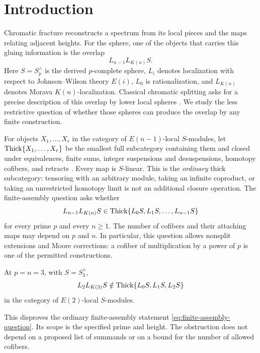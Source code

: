 \section{Introduction}\label{sec:introduction}

Chromatic fracture reconstructs a spectrum from its local pieces and the
maps relating adjacent heights. For the sphere, one of the objects that
carries this gluing information is the overlap
\[
                         L_{n-1}L_{K(n)}S.
\]
Here \(S=S_p^\wedge\) is the derived \(p\)-complete sphere,
\(L_i\) denotes localization with respect to Johnson--Wilson theory
\(E(i)\), \(L_0\) is rationalization, and \(L_{K(n)}\) denotes Morava
\(K(n)\)-localization. Classical chromatic splitting asks for a precise
description of this overlap by lower local spheres
\citep{Hovey93,BB19}. We study the less restrictive question of whether
those spheres can produce the overlap by any finite construction.

For objects \(X_1,\ldots,X_r\) in the category of \(E(n-1)\)-local
\(S\)-modules, let
\(\operatorname{Thick}\{X_1,\ldots,X_r\}\) be the smallest full subcategory containing
them and closed under equivalences, finite sums, integer suspensions and
desuspensions, homotopy cofibers, and retracts
\citep[Definitions~1.2, 1.3(c), and 1.5(c)]{HS99}. Every map is \(S\)-linear.
This is the \emph{ordinary} thick subcategory: tensoring with an arbitrary
module, taking an infinite coproduct, or taking an unrestricted homotopy
limit is not an additional closure operation. The finite-assembly question
asks whether
\begin{equation}\label{eq:finite-assembly-question}
 L_{n-1}L_{K(n)}S\in
       \operatorname{Thick}\{L_0S,L_1S,\ldots,L_{n-1}S\}
\end{equation}
for every prime \(p\) and every \(n\geq1\). The number of cofibers and their
attaching maps may depend on \(p\) and \(n\). In particular, this question
allows nonsplit extensions and Moore corrections: a cofiber of multiplication
by a power of \(p\) is one of the permitted constructions.

\begin{theorem}\label{thm:main}
At \(p=n=3\), with \(S=S_3^\wedge\),
\[
             L_2L_{K(3)}S
                  \notin\operatorname{Thick}\{L_0S,L_1S,L_2S\}
\]
in the category of \(E(2)\)-local \(S\)-modules.
\end{theorem}

This disproves the ordinary finite-assembly statement
\eqref{eq:finite-assembly-question}. Its scope is the specified prime and
height. The obstruction does not depend on a proposed list of summands or
on a bound for the number of allowed cofibers.

